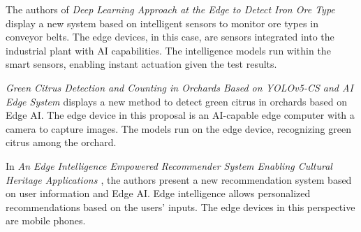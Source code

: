 
The authors of \textit{Deep Learning Approach at the Edge to Detect Iron Ore Type \cite{klippel2021deep}} display a new system based on intelligent sensors to monitor ore types in conveyor belts. The edge devices, in this case, are sensors integrated into the industrial plant with AI capabilities. The intelligence models run within the smart sensors, enabling instant actuation given the test results.



\textit{Green Citrus Detection and Counting in Orchards Based on YOLOv5-CS and AI Edge System \cite{lyu2022green}} displays a new method to detect green citrus in orchards based on Edge AI. The edge device in this proposal is an AI-capable edge computer with a camera to capture images. The models run on the edge device, recognizing green citrus among the orchard.



In \textit{An Edge Intelligence Empowered Recommender System Enabling Cultural Heritage Applications \cite{su2019edge}}, the authors present a new recommendation system based on user information and Edge AI. Edge intelligence allows personalized recommendations based on the users' inputs. The edge devices in this perspective are mobile phones.


